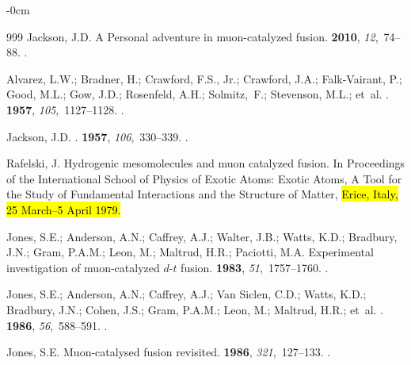 \documentclass[particles,article,accept,pdftex,moreauthors]{Definitions/mdpi}
\begin{document}
\begin{adjustwidth}{-\extralength}{0cm}
\begin{thebibliography}{999}
Jackson, J.D.
\newblock A Personal adventure in muon-catalyzed fusion.
 {\bf 2010}, {\em 12},~74--88.
.

Alvarez, L.W.; Bradner, H.;  Crawford, F.S., Jr.; Crawford, J.A.; Falk-Vairant, P.; Good, M.L.; Gow, J.D.; Rosenfeld, A.H.; Solmitz,~F.; Stevenson, M.L.;  et~al.
.
 {\bf 1957}, {\em 105},~1127--1128.
.

Jackson, J.D.
.
 {\bf 1957}, {\em 106},~330--339.
.

Rafelski, J.
\newblock Hydrogenic mesomolecules and muon catalyzed fusion.
\newblock In Proceedings of the {International School of Physics of Exotic
  Atoms: Exotic Atoms, A Tool for the Study of Fundamental Interactions and the
  Structure of Matter}, \hl{Erice, Italy, 25 March--5 April 1979.} 

Jones, S.E.; Anderson, A.N.;  Caffrey, A.J.; Walter, J.B.; Watts, K.D.; Bradbury, J.N.; Gram, P.A.M.; Leon, M.; Maltrud, H.R.; Paciotti, M.A.
\newblock Experimental investigation of muon-catalyzed $d$-$t$ fusion.
 {\bf 1983}, {\em 51},~1757--1760.
.

Jones, S.E.; Anderson, A.N.;  Caffrey, A.J.; Van Siclen, C.D.; Watts, K.D.; Bradbury, J.N.; Cohen, J.S.; Gram, P.A.M.; Leon, M.; Maltrud, H.R.; et~al.
.
 {\bf 1986}, {\em 56},~588--591.
.

Jones, S.E.
\newblock Muon-catalysed fusion revisited.
 {\bf 1986}, {\em 321},~127--133.
.


\end{thebibliography}
\end{adjustwidth}
\end{document}
